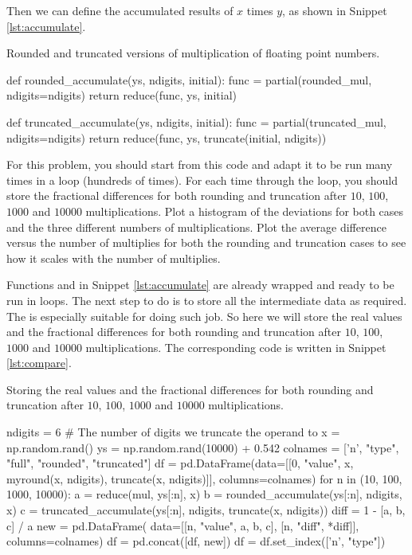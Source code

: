 Then we can define the accumulated results of $x$ times $y$, as shown in Snippet
\ref{lst:accumulate}.

\begin{algorithm}
    \caption{Rounded and truncated versions of multiplication of floating point numbers.}
    \label{lst:accumulate}
    \begin{pythoncode}
        def rounded_accumulate(ys, ndigits, initial):
            func = partial(rounded_mul, ndigits=ndigits)
            return reduce(func, ys, initial)


        def truncated_accumulate(ys, ndigits, initial):
            func = partial(truncated_mul, ndigits=ndigits)
            return reduce(func, ys, truncate(initial, ndigits))
    \end{pythoncode}
\end{algorithm}

\Question For this problem, you should start from this code and adapt it to be run many times in a
loop (hundreds of times). For each time through the loop, you should store the fractional
differences for both rounding and truncation after $10$, $100$, $1000$ and $10000$ multiplications.
Plot a histogram of the deviations for both cases and the three different numbers of
multiplications. Plot the average difference versus the number of multiplies for both the
rounding and truncation cases to see how it scales with the number of multiplies.

\Answer Functions  and  in Snippet
\ref{lst:accumulate} are already wrapped and ready to be run in loops.
The next step to do is to store all the intermediate data as required.
The  is especially suitable for doing such job.
So here we will store the real values and the fractional
differences for both rounding and truncation after $10$, $100$, $1000$ and $10000$
multiplications.
The corresponding code is written in Snippet \ref{lst:compare}.

\begin{algorithm}
    \caption{Storing the real values and the fractional
        differences for both rounding and truncation after $10$, $100$, $1000$ and $10000$
        multiplications.}
    \label{lst:compare}
    \begin{pythoncode}
        ndigits = 6  # The number of digits we truncate the operand to
        x = np.random.rand()
        ys = np.random.rand(10000) + 0.542
        colnames = ['n', "type", "full", "rounded", "truncated"]
        df = pd.DataFrame(data=[[0, "value", x, myround(x, ndigits), truncate(x, ndigits)]],
                          columns=colnames)
        for n in (10, 100, 1000, 10000):
            a = reduce(mul, ys[:n], x)
            b = rounded_accumulate(ys[:n], ndigits, x)
            c = truncated_accumulate(ys[:n], ndigits, truncate(x, ndigits))
            diff = 1 - [a, b, c] / a
            new = pd.DataFrame(
                data=[[n, "value", a, b, c], [n, "diff", *diff]], columns=colnames)
            df = pd.concat([df, new])
        df = df.set_index(['n', "type"])
    \end{pythoncode}
\end{algorithm}

